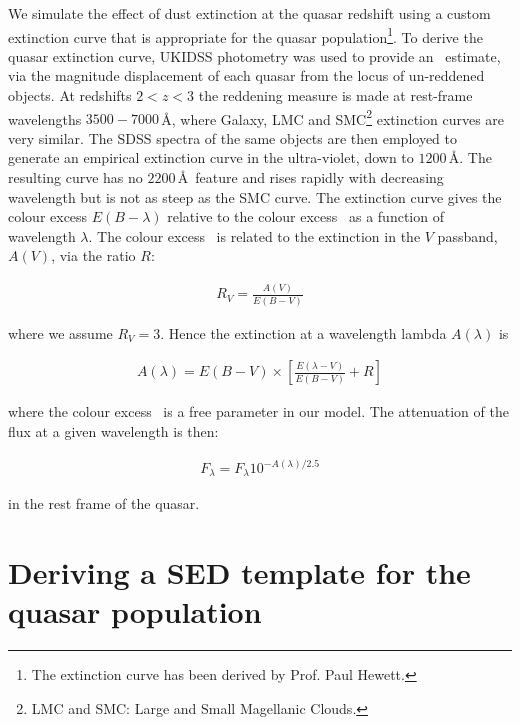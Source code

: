 We simulate the effect of dust extinction at the quasar redshift using a custom extinction curve that is appropriate for the quasar population\footnote{The extinction curve has been derived by Prof. Paul Hewett.}.
To derive the quasar extinction curve, UKIDSS photometry was used to provide an \ebv\, estimate, via the magnitude displacement of each quasar from the locus of un-reddened objects. 
At redshifts $2 < z < 3$ the reddening measure is made at rest-frame wavelengths $3500-7000$\,\AA, where Galaxy, LMC and SMC\footnote{LMC and SMC: Large and Small Magellanic Clouds.} extinction curves are very similar. 
The SDSS spectra of the same objects are then employed to generate an empirical extinction curve in the ultra-violet, down to $1200$\,\AA. 
The resulting curve has no $2200$\,\AA\, feature and rises rapidly with decreasing wavelength but is not as steep as the SMC curve. 
The extinction curve gives the colour excess $E(B-\lambda)$ relative to the colour excess \ebv\, as a function of wavelength $\lambda$. 
The colour excess \ebv\, is related to the extinction in the $V$ passband, $A(V)$, via the ratio $R$: 

\begingroup\makeatletter{}\check@mathfonts
\begin{eqnarray}
  R_V = \frac{A(V)}{E(B-V)}
\end{eqnarray}
\endgroup

\noindent where we assume $R_V = 3$. 
Hence the extinction at a wavelength lambda $A(\lambda)$ is 

\begingroup\makeatletter{}\check@mathfonts
\begin{eqnarray}
  A(\lambda) = E(B-V) \times \left[ \frac{E(\lambda-V)}{E(B-V)} + R \right] 
\end{eqnarray}
\endgroup

\noindent where the colour excess \ebv\, is a free parameter in our model. 
The attenuation of the flux at a given wavelength is then:

\begingroup\makeatletter{}\check@mathfonts
\begin{eqnarray}
  F_\lambda = F_\lambda10^{-A(\lambda)/2.5}
\end{eqnarray}
\endgroup

\noindent in the rest frame of the quasar. 

\section{Deriving a SED template for the quasar population} 
\label{sec:ch5-standardmodel}

